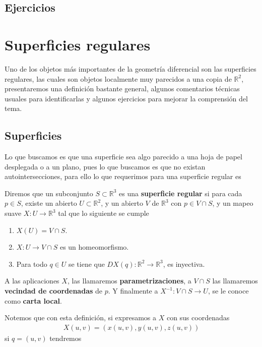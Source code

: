 \documentclass[oneside,11pt]{memoir}
\begin{document}
\section{Ejercicios}

\chapter{Superficies regulares}
Uno de los objetos más importantes de la geometría diferencial son las superficies regulares, las cuales son objetos localmente muy parecidos a una copia de $\mathbb{R}^2$, presentaremos una definición bastante general, algunos comentarios técnicas usuales para identificarlas y algunos ejercicios para mejorar la comprensión del tema.
\section{Superficies}
Lo que buscamos es que una superficie sea algo parecido a una hoja de papel desplegada o a un plano, pues lo que buscamos es que no existan autointersecciones, para ello lo que requerimos para una superficie regular es
\begin{definition}
    Diremos que un subconjunto $S\subset \mathbb{R}^3$ es una \textbf{superficie regular} si para cada $p\in S$, existe un abierto $U\subset \mathbb{R}^2$, y un abierto $V$ de $\mathbb{R}^3$ con $p\in V\cap S$, y un mapeo suave $X:U\to\mathbb{R}^3$ tal que lo siguiente se cumple
    \begin{enumerate}
        \item $X(U)=V\cap S$.
        \item $X:U\to V\cap S$ es un homeomorfismo.
        \item Para todo $q\in U$ se tiene que $DX(q):\mathbb{R}^2\to\mathbb{R}^3$, es inyectiva.
    \end{enumerate}
A las aplicaciones $X$, las llamaremos \textbf{parametrizaciones}, a $V\cap S$ las llamaremos \textbf{vecindad de coordenadas} de $p$. Y finalmente a $X^{-1}:V\cap S\to U$, se le conoce como \textbf{carta local}.
\end{definition}
Notemos que con esta definición, si expresamos a $X$ con sus coordenadas 
\begin{align*}
    X(u,v)=\left(x(u,v), y(u,v), z(u,v)\right)
\end{align*}
si $q=(u,v)$ tendremos
\end{document}
